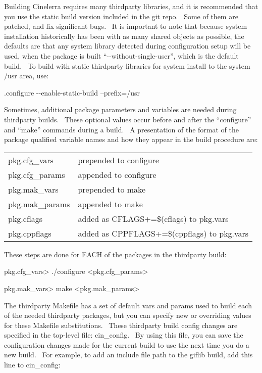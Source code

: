 Building Cinelerra requires many thirdparty libraries, and it is recommended that you use the static build version included in the git repo. \ Some of them are patched, and fix significant bugs. \ It is important to note that because system installation historically has been with as many shared objects as possible, the defaults are that any system library detected during configuration setup will be used, when the package is built ``-{}-without-single-user'', which is the default build. \ To build with static thirdparty libraries for system install to the system /usr area, use:
\smallskip

\hspace{2em}.configure -{}-enable-static-build --prefix=/usr
\medskip

Sometimes, additional package parameters and variables are needed during thirdparty builds. \ These optional values occur before and after the ``configure'' and ``make'' commands during a build. \ A presentation of the format of the package qualified variable names and how they appear in the build procedure are:
\medskip

\hspace{2em}
\begin{tabular}{@{}ll}
	pkg.cfg\_vars & prepended to configure\\
	pkg.cfg\_params & appended to configure\\
	pkg.mak\_vars & prepended to make\\
	pkg.mak\_params & appended to make\\
    pkg.cflags & added as CFLAGS+=\$(cflags) to pkg.vars\\
	pkg.cppflags & added as CPPFLAGS+=\$(cppflags) to pkg.vars\\
\end{tabular}
\bigskip

These steps are done for EACH of the packages in the thirdparty build:
\smallskip

\hspace{2em}{\textless}pkg.cfg\_vars{\textgreater} ./configure {\textless}pkg.cfg\_params{\textgreater}

\hspace{2em}{\textless}pkg.mak\_vars{\textgreater} make {\textless}pkg.mak\_params{\textgreater}
\bigskip

The thirdparty Makefile has a set of default vars and params used to build each of the needed thirdparty packages, but you can specify new or overriding values for these Makefile substitutions. \ These thirdparty build config changes are specified in the top-level file: cin\_config. \ By using this file, you can save the configuration changes made for the current build to use the next time you do a new build. \ For example, to add an include file path to the giflib build, add this line to cin\_config:
\medskip

